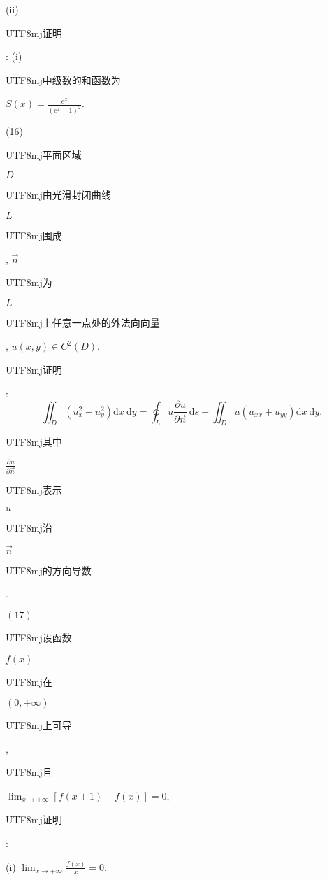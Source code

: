 \documentclass[10pt]{article}
\begin{document}
(ii) \begin{CJK}{UTF8}{mj}证明\end{CJK}: (i) \begin{CJK}{UTF8}{mj}中级数的和函数为\end{CJK} $S(x)=\frac{e^{x}}{\left(e^{x}-1\right)^{2}}$.

(16) \begin{CJK}{UTF8}{mj}平面区域\end{CJK} $D$ \begin{CJK}{UTF8}{mj}由光滑封闭曲线\end{CJK} $L$ \begin{CJK}{UTF8}{mj}围成\end{CJK}, $\vec{n}$ \begin{CJK}{UTF8}{mj}为\end{CJK} $L$ \begin{CJK}{UTF8}{mj}上任意一点处的外法向向量\end{CJK}, $u(x, y) \in C^{2}(D)$. \begin{CJK}{UTF8}{mj}证明\end{CJK}:
$$
\iint_{D}\left(u_{x}^{2}+u_{y}^{2}\right) \mathrm{d} x \mathrm{~d} y=\oint_{L} u \frac{\partial u}{\partial \vec{n}} \mathrm{~d} s-\iint_{D} u\left(u_{x x}+u_{y y}\right) \mathrm{d} x \mathrm{~d} y .
$$
\begin{CJK}{UTF8}{mj}其中\end{CJK} $\frac{\partial u}{\partial \vec{n}}$ \begin{CJK}{UTF8}{mj}表示\end{CJK} $u$ \begin{CJK}{UTF8}{mj}沿\end{CJK} $\vec{n}$ \begin{CJK}{UTF8}{mj}的方向导数\end{CJK}.

$(17)$ \begin{CJK}{UTF8}{mj}设函数\end{CJK} $f(x)$ \begin{CJK}{UTF8}{mj}在\end{CJK} $(0,+\infty)$ \begin{CJK}{UTF8}{mj}上可导\end{CJK}, \begin{CJK}{UTF8}{mj}且\end{CJK} $\lim _{x \rightarrow+\infty}[f(x+1)-f(x)]=0$, \begin{CJK}{UTF8}{mj}证明\end{CJK}:

(i) $\lim _{x \rightarrow+\infty} \frac{f(x)}{x}=0$.
\end{document}

